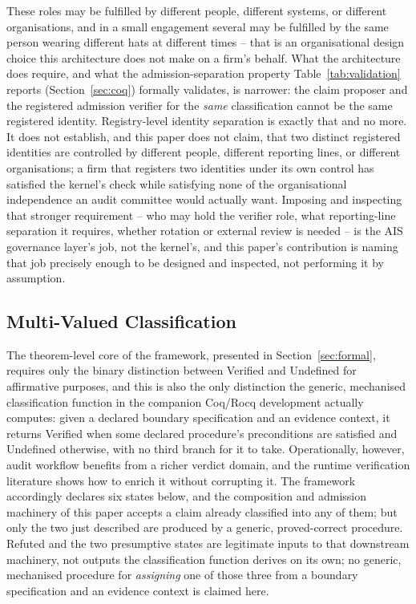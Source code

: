 \documentclass[11pt,a4paper]{article}
\theoremstyle{definition}
\theoremstyle{remark}
\begin{document}
These roles may be fulfilled by different people, different systems, or different organisations, and in a small engagement several may be fulfilled by the same person wearing different hats at different times -- that is an organisational design choice this architecture does not make on a firm's behalf. What the architecture does require, and what the admission-separation property Table~\ref{tab:validation} reports (Section~\ref{sec:coq}) formally validates, is narrower: the claim proposer and the registered admission verifier for the \emph{same} classification cannot be the same registered identity. Registry-level identity separation is exactly that and no more. It does not establish, and this paper does not claim, that two distinct registered identities are controlled by different people, different reporting lines, or different organisations; a firm that registers two identities under its own control has satisfied the kernel's check while satisfying none of the organisational independence an audit committee would actually want. Imposing and inspecting that stronger requirement -- who may hold the verifier role, what reporting-line separation it requires, whether rotation or external review is needed -- is the AIS governance layer's job, not the kernel's, and this paper's contribution is naming that job precisely enough to be designed and inspected, not performing it by assumption.

\subsection{Multi-Valued Classification}
\label{sec:multivalued}

The theorem-level core of the framework, presented in Section~\ref{sec:formal}, requires only the binary distinction between \textsf{Verified} and \textsf{Undefined} for affirmative purposes, and this is also the only distinction the generic, mechanised classification function in the companion Coq/Rocq development actually computes: given a declared boundary specification and an evidence context, it returns \textsf{Verified} when some declared procedure's preconditions are satisfied and \textsf{Undefined} otherwise, with no third branch for it to take. Operationally, however, audit workflow benefits from a richer verdict domain, and the runtime verification literature shows how to enrich it without corrupting it. The framework accordingly declares six states below, and the composition and admission machinery of this paper accepts a claim already classified into any of them; but only the two just described are produced by a generic, proved-correct procedure. \textsf{Refuted} and the two presumptive states are legitimate inputs to that downstream machinery, not outputs the classification function derives on its own; no generic, mechanised procedure for \emph{assigning} one of those three from a boundary specification and an evidence context is claimed here.
\end{document}
